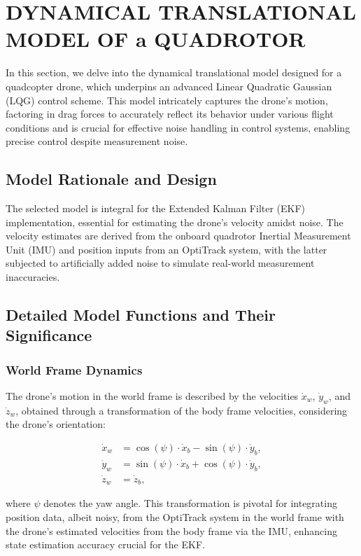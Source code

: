 \section{DYNAMICAL TRANSLATIONAL MODEL OF a QUADROTOR}

In this section, we delve into the dynamical translational model designed for a quadcopter drone, which underpins an advanced Linear Quadratic Gaussian (LQG) control scheme. This model intricately captures the drone's motion, factoring in drag forces to accurately reflect its behavior under various flight conditions and is crucial for effective noise handling in control systems, enabling precise control despite measurement noise.

\subsection{Model Rationale and Design}

The selected model is integral for the Extended Kalman Filter (EKF) implementation, essential for estimating the drone's velocity amidst noise. The velocity estimates are derived from the onboard quadrotor Inertial Measurement Unit (IMU) and position inputs from an OptiTrack system, with the latter subjected to artificially added noise to simulate real-world measurement inaccuracies.

\subsection{Detailed Model Functions and Their Significance}

\subsubsection{World Frame Dynamics}

The drone's motion in the world frame is described by the velocities \( \dot{x}_w \), \( \dot{y}_w \), and \( \dot{z}_w \), obtained through a transformation of the body frame velocities, considering the drone's orientation:

\begin{align}
\dot{x}_w &= \cos(\psi) \cdot \dot{x}_b - \sin(\psi) \cdot \dot{y}_b, \\
\dot{y}_w &= \sin(\psi) \cdot \dot{x}_b + \cos(\psi) \cdot \dot{y}_b, \\
\dot{z}_w &= \dot{z}_b,
\end{align}

where \( \psi \) denotes the yaw angle. This transformation is pivotal for integrating position data, albeit noisy, from the OptiTrack system in the world frame with the drone's estimated velocities from the body frame via the IMU, enhancing state estimation accuracy crucial for the EKF.

